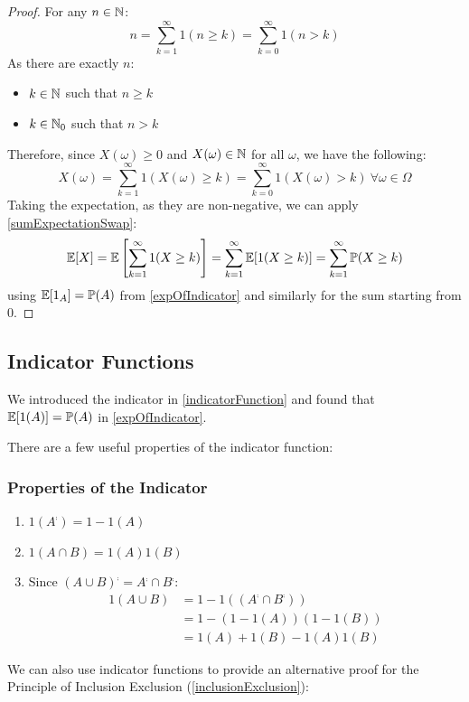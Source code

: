 \documentclass[../main.tex]{subfiles}
\begin{document}
\begin{proof}
  For any $n \in \mathbb{N}$:
  \[
    n = \sum_{k = 1}^{\infty} 1(n \geq k) = \sum_{k = 0}^{\infty} 1(n > k)
  \]
  As there are exactly $n$:
  \begin{itemize}
    \item $k \in \mathbb{N}$ such that $n \geq k$
    \item  $k \in \mathbb{N}_0$ such that $n > k$
  \end{itemize}
  Therefore, since $X(\omega) \geq 0$ and $X(\omega) \in \mathbb{N}$ for all $\omega$, we have the following:
  \[
    X(\omega) = \sum_{k = 1}^{\infty} 1(X(\omega) \geq k) = \sum_{k = 0}^{\infty} 1(X(\omega) > k)\ \forall \omega \in \Omega
  \]
  Taking the expectation, as they are non-negative, we can apply \cref{sumExpectationSwap}:
  \[
    \mathbb{E}[X] = \mathbb{E}\left[\sum_{k = 1}^{\infty} 1(X \geq k)\right] = \sum_{k = 1}^{\infty} \mathbb{E}[1(X \geq k)] = \sum_{k = 1}^{\infty} \mathbb{P}(X \geq k)
  \]
  using $\mathbb{E}[1_A] = \mathbb{P}(A)$ from \cref{expOfIndicator} and similarly for the sum starting from 0.
\end{proof}
\subsection{Indicator Functions}
We introduced the indicator in \cref{indicatorFunction} and found that $\mathbb{E}[1(A)] = \mathbb{P}(A)$ in \cref{expOfIndicator}.

There are a few useful properties of the indicator function:
\subsubsection{Properties of the Indicator}
\begin{enumerate}
  \item $1(A^{\comp}) = 1 - 1(A)$
  \item $1(A \cap B) = 1(A)1(B)$
  \item Since $(A \cup B)^{\comp} = A^{\comp} \cap B^{\comp}$:
    \begin{align*}
      1(A \cup B) &= 1 - 1((A^{\comp} \cap B^{\comp})) \\
                  &= 1 - (1 - 1(A))(1 - 1(B)) \\
                  &= 1(A) + 1(B) - 1(A)1(B)
    \end{align*}
\end{enumerate}
We can also use indicator functions to provide an alternative proof for the Principle of Inclusion Exclusion (\cref{inclusionExclusion}):
\end{document}
